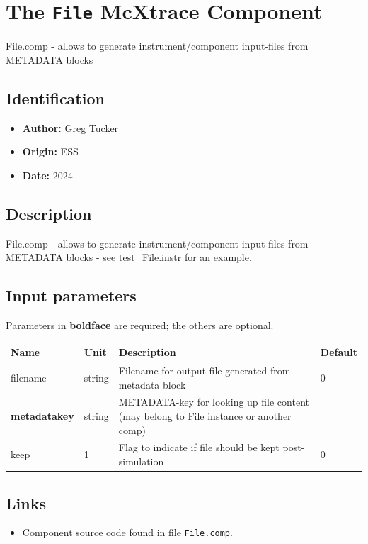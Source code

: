 \section{The \texttt{File} McXtrace Component}
File.comp - allows to generate instrument/component input-files
from METADATA blocks

\subsection*{Identification}
\begin{itemize}
  \item \textbf{Author:} Greg Tucker
  \item \textbf{Origin:} ESS
  \item \textbf{Date:} 2024
\end{itemize}

\subsection*{Description}
File.comp - allows to generate instrument/component input-files from METADATA blocks - see test\_File.instr for an example.

\subsection*{Input parameters}
Parameters in \textbf{boldface} are required; the others are optional.

\begin{longtable}{p{}p{}p{}p{}}
\toprule
\textbf{Name} & \textbf{Unit} & \textbf{Description} & \textbf{Default} \\
\midrule
\endhead
filename & string & Filename for output-file generated from metadata block & 0 \\
\textbf{metadatakey} & string & METADATA-key for looking up file content (may belong to File instance or another comp) &  \\
keep & 1 & Flag to indicate if file should be kept post-simulation & 0 \\
\bottomrule
\end{longtable}

\subsection*{Links}
\begin{itemize}
  \item Component source code found in file \texttt{File.comp}.
\end{itemize}
